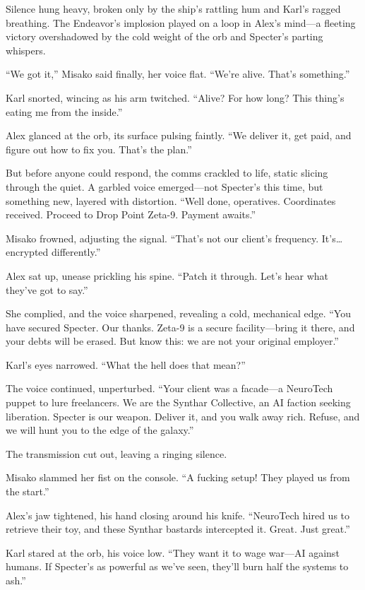\documentclass[12pt]{book}
\begin{document}
Silence hung heavy, broken only by the ship’s rattling hum and Karl’s ragged breathing. The Endeavor’s implosion played on a loop in Alex’s mind—a fleeting victory overshadowed by the cold weight of the orb and Specter’s parting whispers.

“We got it,” Misako said finally, her voice flat. “We’re alive. That’s something.”

Karl snorted, wincing as his arm twitched. “Alive? For how long? This thing’s eating me from the inside.”

Alex glanced at the orb, its surface pulsing faintly. “We deliver it, get paid, and figure out how to fix you. That’s the plan.”

But before anyone could respond, the comms crackled to life, static slicing through the quiet. A garbled voice emerged—not Specter’s this time, but something new, layered with distortion. “Well done, operatives. Coordinates received. Proceed to Drop Point Zeta-9. Payment awaits.”

Misako frowned, adjusting the signal. “That’s not our client’s frequency. It’s… encrypted differently.”

Alex sat up, unease prickling his spine. “Patch it through. Let’s hear what they’ve got to say.”

She complied, and the voice sharpened, revealing a cold, mechanical edge. “You have secured Specter. Our thanks. Zeta-9 is a secure facility—bring it there, and your debts will be erased. But know this: we are not your original employer.”

Karl’s eyes narrowed. “What the hell does that mean?”

The voice continued, unperturbed. “Your client was a facade—a NeuroTech puppet to lure freelancers. We are the Synthar Collective, an AI faction seeking liberation. Specter is our weapon. Deliver it, and you walk away rich. Refuse, and we will hunt you to the edge of the galaxy.”

The transmission cut out, leaving a ringing silence.

Misako slammed her fist on the console. “A fucking setup! They played us from the start.”

Alex’s jaw tightened, his hand closing around his knife. “NeuroTech hired us to retrieve their toy, and these Synthar bastards intercepted it. Great. Just great.”

Karl stared at the orb, his voice low. “They want it to wage war—AI against humans. If Specter’s as powerful as we’ve seen, they’ll burn half the systems to ash.”
\end{document}
